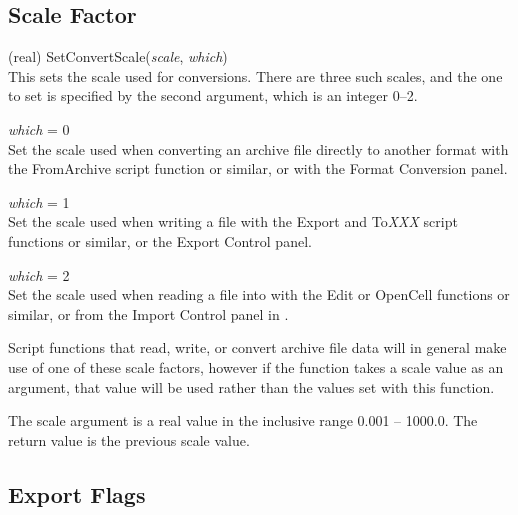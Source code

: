 \subsection{Scale Factor}
\begin{description}
\item{(real) \vt SetConvertScale({\it scale\/}, {\it which\/})}\\
This sets the scale used for conversions.  There are three such
scales, and the one to set is specified by the second argument, which
is an integer 0--2.
\begin{description}
\item{{\it which} = 0}\\
Set the scale used when converting an archive file directly to another
format with the\newline
{\vt FromArchive} script function or similar, or with the {\cb Format
Conversion} panel.
\item{{\it which} = 1}\\
Set the scale used when writing a file with the {\vt Export} and {\vt
To{\it XXX\/}} script functions or similar, or the {\cb Export
Control} panel.
\item{{\it which} = 2}\\
Set the scale used when reading a file into {\Xic} with the {\vt Edit}
or {\vt OpenCell} functions or similar, or from the {\cb Import
Control} panel in {\Xic}.
\end{description}
Script functions that read, write, or convert archive file data will
in general make use of one of these scale factors, however if the
function takes a scale value as an argument, that value will be used
rather than the values set with this function.

The scale argument is a real value in the inclusive range 0.001 --
1000.0.  The return value is the previous scale value.

\end{description}


\subsection{Export Flags}

